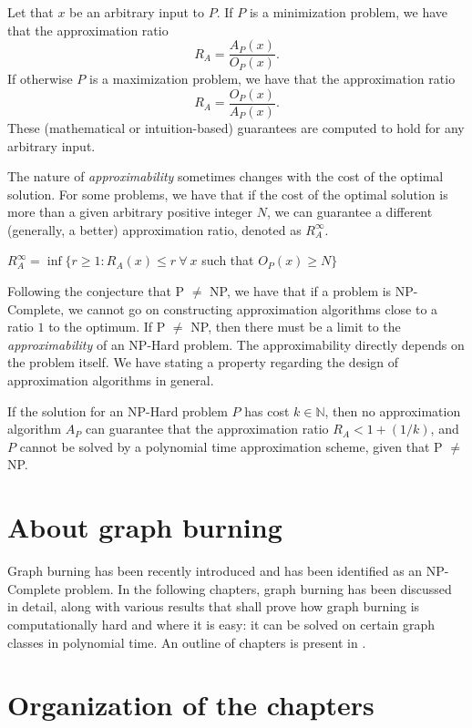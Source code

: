 Let that $x$ be an arbitrary input to $P$. If $P$ is a minimization problem, we have that the approximation ratio $$R_A=\frac{A_P(x)}{O_P(x)}.$$
If otherwise $P$ is a maximization problem, we have that the approximation ratio $$R_A=\frac{O_P(x)}{A_P(x)}.$$
These (mathematical or intuition-based) guarantees are computed to hold for any arbitrary input.

The nature of \textit{approximability} sometimes changes with the cost of the optimal solution. For some problems, we have that if the cost of the optimal solution is more than a given arbitrary positive integer $N$, we can guarantee a different (generally, a better) approximation ratio, denoted as $R_A^\infty$.
\begin{center}
    $R_A^\infty=\inf\{r\geq 1:R_A(x)\leq r\ \forall\ x$ such that $O_P(x)\geq N\}$
\end{center}

Following the conjecture that P $\neq$ NP, we have that if a problem is NP-Complete, we cannot go on constructing approximation algorithms close to a ratio $1$ to the optimum. If P $\neq$ NP, then there must be a limit to the \textit{approximability} of an NP-Hard problem. The approximability directly depends on the problem itself. We have  \cite{Garey1979} stating a property regarding the design of approximation algorithms in general.

\begin{theorem}\label{theorem:approximability-general}
    If the solution for an NP-Hard problem $P$ has cost $k\in\mathbb{N}$, then no approximation algorithm $A_P$ can guarantee that the approximation ratio $R_A<1+(1/k)$, and $P$ cannot be solved by a polynomial time approximation scheme, given that P $\neq$ NP.
\end{theorem}

\section{About graph burning}

Graph burning has been recently introduced and has been identified as an NP-Complete problem. In the following chapters, graph burning has been discussed in detail, along with various results that shall prove how graph burning is computationally hard and where it is easy: it can be solved on certain graph classes in polynomial time. An outline of chapters is present in .

\section{Organization of the chapters}\label{section:organization-of-chapters}

